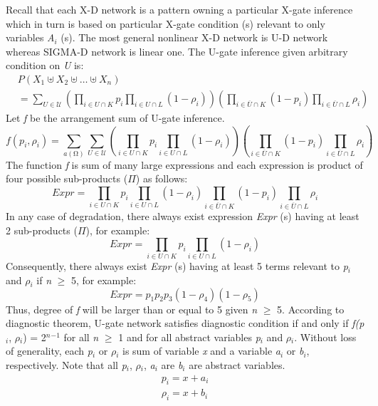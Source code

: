 \documentclass{article}
\numberwithin{equation}{section}
\numberwithin{figure}{section}
\numberwithin{table}{section}
\begin{document}
Recall that each X-D network is a pattern owning a particular X-gate inference which in turn is based on particular X-gate condition (s) relevant to only variables \textit{A${}_{i}$} (s). The most general nonlinear X-D network is U-D network whereas SIGMA-D network is linear one. The U-gate inference given arbitrary condition on \textit{U} is:
\begin{align*}
&P\left(X_1\uplus X_2\uplus \dots \uplus X_n\right)\\
&=\sum_{U\in \mathcal{U}}{\left(\prod_{i\in U\cap K}{p_i}\prod_{i\in U\cap L}{\left(1-{\rho }_i\right)}\right)\left(\prod_{i\in \overline{U}\cap K}{\left(1-p_i\right)}\prod_{i\in \overline{U}\cap L}{{\rho }_i}\right)}
\end{align*}
Let \textit{f} be the arrangement sum of U-gate inference.
\[f\left(p_i,{\rho }_i\right)=\sum_{a\left(\mathrm{\Omega }\right)}{\sum_{U\in \mathcal{U}}{\left(\prod_{i\in U\cap K}{p_i}\prod_{i\in U\cap L}{\left(1-{\rho }_i\right)}\right)\left(\prod_{i\in \overline{U}\cap K}{\left(1-p_i\right)}\prod_{i\in \overline{U}\cap L}{{\rho }_i}\right)}}\]
The function \textit{f} is sum of many large expressions and each expression is product of four possible sub-products ($\Pi$) as follows:
\[Expr=\prod_{i\in U\cap K}{p_i}\prod_{i\in U\cap L}{\left(1-{\rho }_i\right)}\prod_{i\in \overline{U}\cap K}{\left(1-p_i\right)}\prod_{i\in \overline{U}\cap L}{{\rho }_i}\] 
In any case of degradation, there always exist expression \textit{Expr} (s) having at least 2 sub-products ($\Pi$), for example:
\[Expr=\prod_{i\in U\cap K}{p_i}\prod_{i\in U\cap L}{\left(1-{\rho }_i\right)}\] 
Consequently, there always exist \textit{Expr} (s) having at least 5 terms relevant to \textit{p${}_{i}$} and \textit{$\rho$${}_{i}$} if \textit{n }$\mathrm{\ge}$ 5, for example:
\[Expr=p_1p_2p_3\left(1-{\rho }_4\right)\left(1-{\rho }_5\right)\] 
Thus, degree of \textit{f} will be larger than or equal to 5 given \textit{n }$\mathrm{\ge}$ 5. According to diagnostic theorem, U-gate network satisfies diagnostic condition if and only if \textit{f(p${}_{i}$}, \textit{$\rho$${}_{i}$}) = 2\textit{${}^{n}$}${}^{-1}$ for all \textit{n} $\mathrm{\ge}$ 1 and for all abstract variables \textit{p${}_{i}$} and \textit{$\rho$${}_{i}$}. Without loss of generality, each \textit{p${}_{i}$} or \textit{$\rho$${}_{i}$} is sum of variable \textit{x} and a variable \textit{a${}_{i}$} or \textit{b${}_{i}$}, respectively. Note that all \textit{p${}_{i}$}, \textit{$\rho$${}_{i}$}, \textit{a${}_{i}$} are \textit{b${}_{i}$} are abstract variables.
\begin{align*}
p_i=x+a_i\\
\rho_i=x+b_i
\end{align*}
\end{document}
